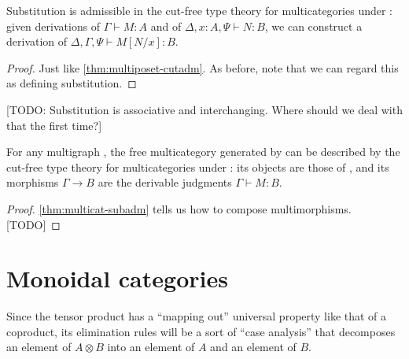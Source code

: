 \documentclass{book}
\makeatletter
\let\types\vdash
\def\type{\;\ftype}
\def\ttt{\mathsf{tt}}
\def\pair#1#2{\langle #1,#2\rangle}
\def\one{\mathbf{1}}
\def\discard#1in{\mathsf{discard}\; #1 \; \mathsf{in} \;}
\let\tensor\otimes
\def\tensorI{\mathord{\tensor}I}
\def\tensorE{\mathord{\tensor}E}
\def\flet#1:{\mathsf{let}\;#1 \@ifnextchar:\@fletdoublecolon\@fletsinglecolon}
\def\@fletdoublecolon:=#1in{\Coloneqq #1\;\mathsf{in}\;}
\def\@fletsinglecolon=#1in{\coloneqq #1\;\mathsf{in}\;}
\makeatother
\begin{document}
\begin{thm}\label{thm:multicat-subadm}
  Substitution is admissible in the cut-free type theory for multicategories under \cG: given derivations of $\Gamma\types M:A$ and of $\Delta,x:A,\Psi\types N:B$, we can construct a derivation of $\Delta,\Gamma,\Psi\types M[N/x]:B$.
\end{thm}
\begin{proof}
  Just like \cref{thm:multiposet-cutadm}.
  As before, note that we can regard this as defining substitution.
\end{proof}

[TODO: Substitution is associative and interchanging.  Where should we deal with that the first time?]

\begin{thm}\label{thm:multicat-initial}
  For any multigraph \cG, the free multicategory generated by \cG can be described by the cut-free type theory for multicategories under \cG: its objects are those of \cG, and its morphisms $\Gamma\to B$ are the derivable judgments $\Gamma\types M:B$.
\end{thm}
\begin{proof}
  \cref{thm:multicat-subadm} tells us how to compose multimorphisms.
  [TODO]
\end{proof}


\section{Monoidal categories}
\label{sec:moncat}

Since the tensor product has a ``mapping out'' universal property like that of a coproduct, its elimination rules will be a sort of ``case analysis'' that decomposes an element of $A\tensor B$ into an element of $A$ and an element of $B$.
\end{document}
